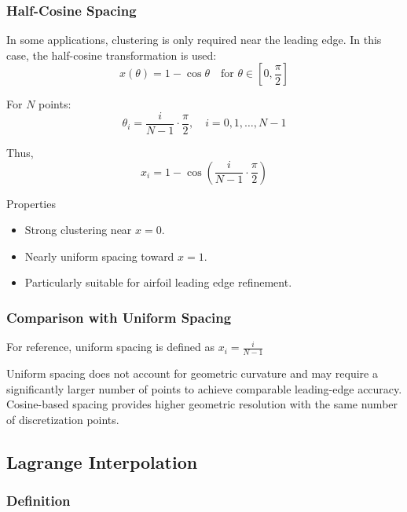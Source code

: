 
\subsubsection*{Half-Cosine Spacing}

In some applications, clustering is only required near the leading edge.  
In this case, the half-cosine transformation is used:
\[
x(\theta) = 1 - \cos \theta 
\quad \text{for } \theta \in \left[0, \frac{\pi}{2}\right]
\]

For $N$ points:
\[
\theta_i = \frac{i}{N-1} \cdot \frac{\pi}{2}, \quad i = 0,1,\dots,N-1
\]

Thus,
\[
x_i = 1 - \cos \left( \frac{i}{N-1} \cdot \frac{\pi}{2} \right)
\]

Properties

\begin{itemize}
    \item Strong clustering near $x=0$.
    \item Nearly uniform spacing toward $x=1$.
    \item Particularly suitable for airfoil leading edge refinement.
\end{itemize}


\subsubsection*{Comparison with Uniform Spacing}

For reference, uniform spacing is defined as 
$
x_i = \displaystyle \frac{i}{N-1}
$

Uniform spacing does not account for geometric curvature and may require a significantly larger number of points to achieve comparable leading-edge accuracy. 
Cosine-based spacing provides higher geometric resolution with the same number of discretization points.


\subsection*{Lagrange Interpolation}


\subsubsection*{Definition}

